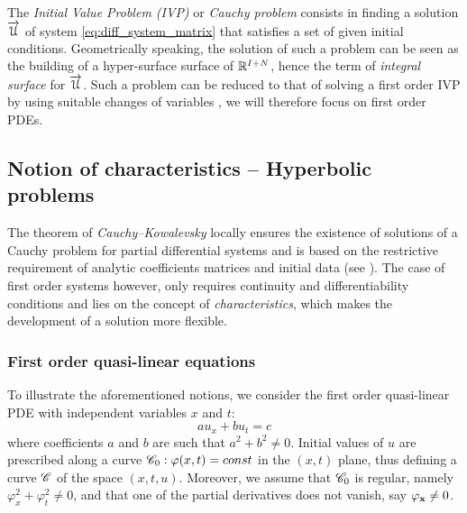 The \textit{Initial Value Problem (IVP)} or \textit{Cauchy problem} consists in finding a solution ${\overrightarrow{\mathcal{U}}}$ of system \eqref{eq:diff_system_matrix} that satisfies a set of given initial conditions. Geometrically speaking, the solution of such a problem can be seen as the building of a hyper-surface surface of $\mathbb{R}^{I+N}$, hence the term of \textit{integral surface} for ${\overrightarrow{\mathcal{U}}}$. Such a problem can be reduced to that of solving a first order IVP by using suitable changes of variables \cite[p.54]{PDEs}, we will therefore focus on first order PDEs.

\subsection{Notion of characteristics -- Hyperbolic problems}
The theorem of \textit{Cauchy--Kowalevsky} locally ensures the existence of solutions of a Cauchy problem for partial differential systems and is based on the restrictive requirement of analytic coefficients matrices and initial data (see \cite[p.46]{PDEs}). The case of first order systems however, only requires continuity and differentiability conditions and lies on the concept of \textit{characteristics}, which makes the development of a solution more flexible.

\subsubsection*{First order quasi-linear equations}
To illustrate the aforementioned notions, we consider the first order quasi-linear PDE with independent variables $x$ and $t$:
\begin{equation}
  \label{eq:1st_order_pde}
   a u_x + b u_t  = c
\end{equation}
where coefficients $a$ and $b$ are such that $a^2 + b^2 \neq 0$. Initial values of $u$ are prescribed along a curve $\mathscr{C}_0:\varphi(x,t)=const$ in the $(x,t)$ plane, thus defining a curve $\mathscr{C}$ of the space $(x,t,u)$.
Moreover, we assume that $\mathscr{C}_0$ is regular, namely $\varphi_x^2 + \varphi_t^2 \neq 0$, and that one of the partial derivatives does not vanish, say $\varphi_{\mathbf{x}} \neq 0$.

